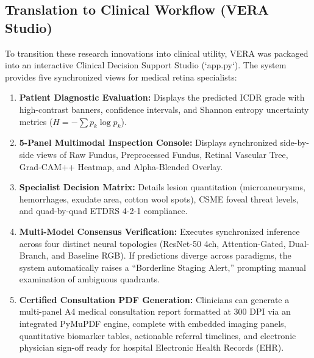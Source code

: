 \documentclass[conference]{IEEEtran}
\begin{document}
\subsection{Translation to Clinical Workflow (VERA Studio)}
To transition these research innovations into clinical utility, VERA was packaged into an interactive Clinical Decision Support Studio (`app.py`). The system provides five synchronized views for medical retina specialists:
\begin{enumerate}
    \item \textbf{Patient Diagnostic Evaluation:} Displays the predicted ICDR grade with high-contrast banners, confidence intervals, and Shannon entropy uncertainty metrics ($H = -\sum p_k \log p_k$).
    \item \textbf{5-Panel Multimodal Inspection Console:} Displays synchronized side-by-side views of Raw Fundus, Preprocessed Fundus, Retinal Vascular Tree, Grad-CAM++ Heatmap, and Alpha-Blended Overlay.
    \item \textbf{Specialist Decision Matrix:} Details lesion quantitation (microaneurysms, hemorrhages, exudate area, cotton wool spots), CSME foveal threat levels, and quad-by-quad ETDRS 4-2-1 compliance.
    \item \textbf{Multi-Model Consensus Verification:} Executes synchronized inference across four distinct neural topologies (ResNet-50 4ch, Attention-Gated, Dual-Branch, and Baseline RGB). If predictions diverge across paradigms, the system automatically raises a ``Borderline Staging Alert,'' prompting manual examination of ambiguous quadrants.
    \item \textbf{Certified Consultation PDF Generation:} Clinicians can generate a multi-panel A4 medical consultation report formatted at 300 DPI via an integrated PyMuPDF engine, complete with embedded imaging panels, quantitative biomarker tables, actionable referral timelines, and electronic physician sign-off ready for hospital Electronic Health Records (EHR).
\end{enumerate}
\end{document}
